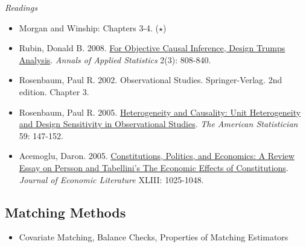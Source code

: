 \documentclass{article}
\begin{document}
\emph{Readings}
\begin{itemize}
\item Morgan and Winship: Chapters 3-4. ($\star$)
\item Rubin, Donald B. 2008.  \href{http://arxiv.org/pdf/0811.1640}
  {For Objective Causal Inference, Design Trumps
    Analysis}. \textit{Annals of Applied Statistics} 2(3):
  808-840.
\item Rosenbaum, Paul R. 2002. Observational
  Studies. Springer-Verlag. 2nd edition. Chapter 3.
\item Rosenbaum, Paul R. 2005.
  \href{http://stat.wharton.upenn.edu/~rosenbap/heteroReprint.pdf}
  {Heterogeneity and Causality: Unit Heterogeneity and Design
    Sensitivity in Observational Studies}. \textit{The American
    Statistician} 59: 147-152.
\item Acemoglu, Daron. 2005.
  \href{http://economics.mit.edu/files/4468}
  {Constitutions, Politics, and Economics: A Review Essay on Persson
    and Tabellini's The Economic Effects of
    Constitutions}. \textit{Journal of Economic Literature}
  XLIII: 1025-1048.
\end{itemize}

\subsection{Matching Methods}
\begin{itemize}
\item Covariate Matching, Balance Checks, Properties of Matching Estimators
\end{itemize}
\end{document}
